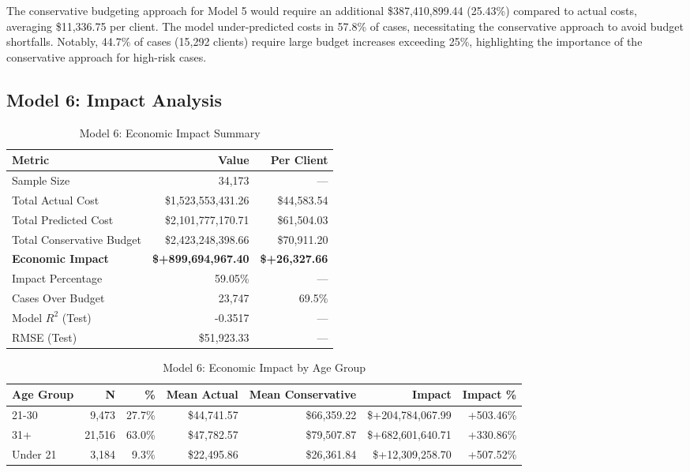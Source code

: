 The conservative budgeting approach for Model 5 would require an additional \$387,410,899.44 (25.43\%) compared to actual costs, averaging \$11,336.75 per client. The model under-predicted costs in 57.8\% of cases, necessitating the conservative approach to avoid budget shortfalls. Notably, 44.7\% of cases (15,292 clients) require large budget increases exceeding 25\%, highlighting the importance of the conservative approach for high-risk cases. 

\clearpage

\subsection{Model 6: Impact Analysis}
\label{subsec:model6_impact}

\begin{table}[htbp]
\centering
\small
\caption{Model 6: Economic Impact Summary}
\label{tab:model6_impact_summary}
\begin{tabular}{lrr}
\toprule
\textbf{Metric} & \textbf{Value} & \textbf{Per Client} \\
\midrule
Sample Size & 34,173 & --- \\
\midrule
Total Actual Cost & \$1,523,553,431.26 & \$44,583.54 \\
Total Predicted Cost & \$2,101,777,170.71 & \$61,504.03 \\
Total Conservative Budget & \$2,423,248,398.66 & \$70,911.20 \\
\midrule
\textbf{Economic Impact} & \textbf{\$+899,694,967.40} & \textbf{\$+26,327.66} \\
Impact Percentage & 59.05\% & --- \\
\midrule
Cases Over Budget & 23,747 & 69.5\% \\
\midrule
Model $R^2$ (Test) & -0.3517 & --- \\
RMSE (Test) & \$51,923.33 & --- \\
\bottomrule
\end{tabular}
\end{table}

\begin{table}[htbp]
\centering
\small
\caption{Model 6: Economic Impact by Age Group}
\label{tab:model6_impact_age}
\begin{tabular}{lrrrrrr}
\toprule
\textbf{Age Group} & \textbf{N} & \textbf{\%} & \textbf{Mean Actual} & \textbf{Mean Conservative} & \textbf{Impact} & \textbf{Impact \%} \\
\midrule
21-30 & 9,473 & 27.7\% & \$44,741.57 & \$66,359.22 & \$+204,784,067.99 & +503.46\% \\
31+ & 21,516 & 63.0\% & \$47,782.57 & \$79,507.87 & \$+682,601,640.71 & +330.86\% \\
Under 21 & 3,184 & 9.3\% & \$22,495.86 & \$26,361.84 & \$+12,309,258.70 & +507.52\% \\
\bottomrule
\end{tabular}
\end{table}

